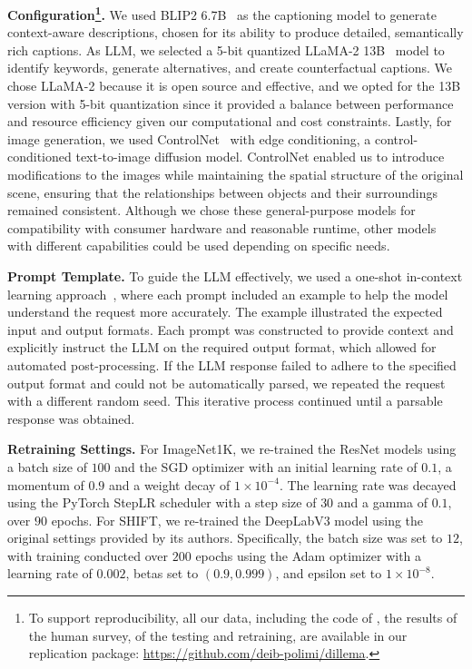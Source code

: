 \noindent\textbf{\approach Configuration\footnote{
To support reproducibility, all our data, including the code of \approach, the results of the human survey, of the testing and retraining, are available in our replication package: \url{https://github.com/deib-polimi/dillema}.}.} We used BLIP2 6.7B~\cite{DBLP:conf/icml/0008LSH23} as the captioning model to generate context-aware descriptions, chosen for its ability to produce detailed, semantically rich captions. As LLM, we selected a 5-bit quantized LLaMA-2 13B~\cite{DBLP:journals/corr/abs-2307-09288} model to identify keywords, generate alternatives, and create counterfactual captions. We chose LLaMA-2 because it is open source and effective, and we opted for the 13B version with 5-bit quantization since it provided a balance between performance and resource efficiency given our computational and cost constraints.
Lastly, for image generation, we used ControlNet~\cite{DBLP:conf/iccv/ZhangRA23} with edge conditioning, a control-conditioned text-to-image diffusion model. ControlNet enabled us to introduce modifications to the images while maintaining the spatial structure of the original scene, ensuring that the relationships between objects and their surroundings remained consistent.
Although we chose these general-purpose models for compatibility with consumer hardware and reasonable runtime, other models with different capabilities could be used depending on specific needs.

\noindent\textbf{Prompt Template.} To guide the LLM effectively, we used a one-shot in-context learning approach~\cite{DBLP:conf/nips/Wei0SBIXCLZ22}, where each prompt included an example to help the model understand the request more accurately. The example illustrated the expected input and output formats. Each prompt was constructed to provide context and explicitly instruct the LLM on the required output format, which allowed for automated post-processing. If the LLM response failed to adhere to the specified output format and could not be automatically parsed, we repeated the request with a different random seed. This iterative process continued until a parsable response was obtained.

\noindent\textbf{Retraining Settings.}
For ImageNet1K, we re-trained the ResNet models using a batch size of $100$ and the SGD optimizer with an initial learning rate of $0.1$, a momentum of $0.9$ and a weight decay of $1 \times 10^{-4}$. The learning rate was decayed using the PyTorch StepLR scheduler with a step size of $30$ and a gamma of $0.1$, over $90$ epochs.
For SHIFT, we re-trained the DeepLabV3 model using the original settings provided by its authors. Specifically, the batch size was set to $12$, with training conducted over $200$ epochs using the Adam optimizer with a learning rate of $0.002$, betas set to $(0.9, 0.999)$, and epsilon set to $1 \times 10^{-8}$.


